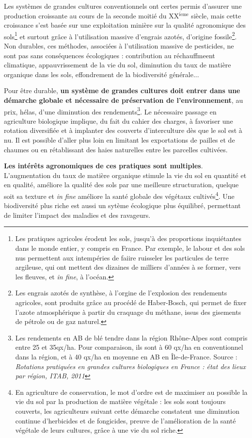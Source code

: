 \documentclass{book}
\begin{document}
Les systèmes de grandes cultures conventionnels ont certes permis d'assurer une production croissante au cours de la seconde moitié du XX$^{\mathrm{i\grave{e}me}}$ siècle, mais cette croissance s'est basée sur une exploitation minière sur la qualité agronomique des sols\footnote{Les pratiques agricoles érodent les sols, jusqu'à des proportions inquiétantes dans le monde entier, y compris en France. Par exemple, le labour et des sols nus permettent aux intempéries de faiire ruisseler les particules de terre argileuse, qui ont mettent des dizaines de milliers d'années à se former, vers les fleuves, et \textit{in fine}, à l'océan.} et surtout grâce à l'utilisation massive d'engrais azotés, d'origine fossile\footnote{Les engrais azotés de synthèse, à l'orgine de l'explosion des rendements agricoles, sont produits grâce au procédé de Haber-Bosch, qui permet de fixer l'azote atmosphérique à partir du craquage du méthane, issus des gisements de pétrole ou de gaz naturel.}. Non durables, ces méthodes, associées à l'utilisation massive de pesticides, ne sont pas sans conséquences écologiques : contribution au réchauffmeent climatique, appauvrissement de la vie du sol, diminution du taux de matière organique dans les sols, effondrement de la biodiversité générale...

Pour être durable, \textbf{un système de grandes cultures doit entrer dans une démarche globale et nécessaire de préservation de l'environnement}, au prix, hélas, d'une diminution des rendements\footnote{Les rendements en AB de blé tendre dans la région Rhône-Alpes sont compris entre 25 et 35qx/ha. Pour comparaison, ils sont à 60 qx/ha en conventionnel dans la région, et à 40 qx/ha en moyenne en AB en Île-de-France. Source : \textit{Rotations pratiquées en grandes cultures biologiques en France : état des lieux par région, ITAB, 2011}}. Le nécessaire passage en agriculture biologique implique, du fait du cahier des charges, à favoriser une rotation diversifiée et à implanter des couverts d'interculture dès que le sol est à nu. Il est possible d'aller plus loin en limitant les exportations de pailles et de chaumes ou en rétablissant des haies naturelles entre les parcelles cultivées.

\textbf{Les intérêts agronomiques de ces pratiques sont multiples}. L'augmentation du taux de matière organique stimule la vie du sol en quantité et en qualité, améliore la qualité des sols par une meilleure structuration, quelque soit sa texture et \textit{in fine} améliore la santé globale des végétaux cultivés\footnote{En agriculture de conservation, le mot d'ordre est de maximiser au possible la vie du sol par la production de matière végétale : les sols sont toujours couverts, les agriculteurs suivant cette démarche constatent une diminution continue d'herbicides et de fongicides, preuve de l'amélioration de la santé végétale de leurs cultures, grâce à une vie du sol riche.}. Une biodiversité plus riche est aussi un sytème écologique plus équilibré, permettant de limiter l'impact des maladies et des ravageurs.
\end{document}
